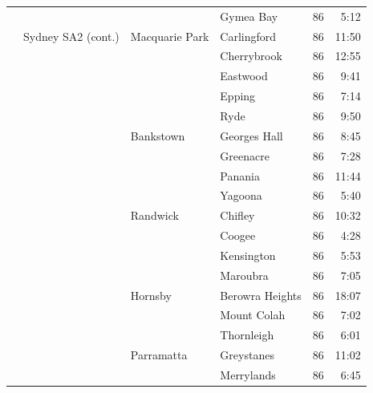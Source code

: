 \documentclass{grattan}
\begin{document}
\begin{longtable}{Nlllrr}
 &                                &                       & Gymea Bay            & 86  & 5:12 \\
 & Sydney SA2 (cont.)             & Macquarie Park        & Carlingford          & 86  & 11:50 \\
 &                                &                       & Cherrybrook          & 86  & 12:55 \\
 &                                &                       & Eastwood             & 86  & 9:41 \\
 &                                &                       & Epping               & 86  & 7:14 \\
 &                                &                       & Ryde                 & 86  & 9:50 \\
 &                                & Bankstown             & Georges Hall         & 86  & 8:45 \\
 &                                &                       & Greenacre            & 86  & 7:28 \\
 &                                &                       & Panania              & 86  & 11:44 \\
 &                                &                       & Yagoona              & 86  & 5:40 \\
 &                                & Randwick              & Chifley              & 86  & 10:32 \\
 &                                &                       & Coogee               & 86  & 4:28 \\
 &                                &                       & Kensington           & 86  & 5:53 \\
 &                                &                       & Maroubra             & 86  & 7:05 \\
 &                                & Hornsby               & Berowra Heights      & 86  & 18:07 \\
 &                                &                       & Mount Colah          & 86  & 7:02 \\
 &                                &                       & Thornleigh           & 86  & 6:01 \\
 &                                & Parramatta            & Greystanes           & 86  & 11:02 \\
 &                                &                       & Merrylands           & 86  & 6:45 \\

\end{longtable}
\end{document}
